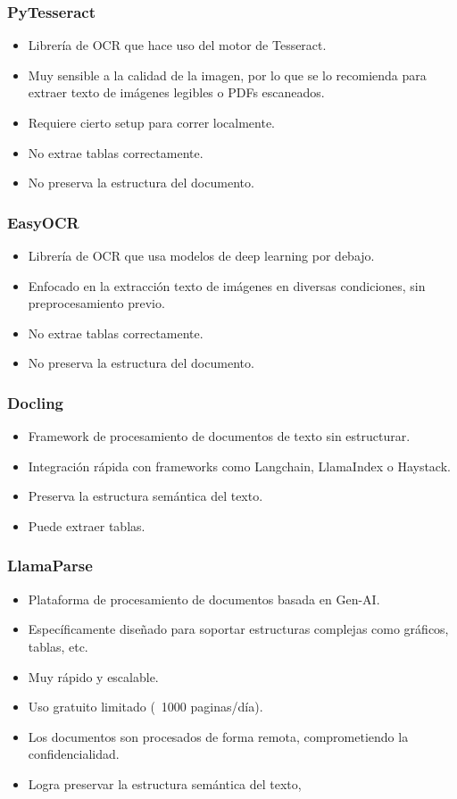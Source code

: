 \documentclass[12pt, a4paper]{report}
\begin{document}
\subsubsection*{PyTesseract}
\begin{itemize}
    \item Librería de OCR que hace uso del motor de Tesseract.
    \item Muy sensible a la calidad de la imagen, por lo que se lo recomienda para extraer texto de imágenes legibles o PDFs escaneados.
    \item Requiere cierto setup para correr localmente.
    \item No extrae tablas correctamente.
    \item No preserva la estructura del documento.
\end{itemize}

\subsubsection*{EasyOCR}
\begin{itemize}
    \item Librería de OCR que usa modelos de deep learning por debajo.
    \item Enfocado en la extracción texto de imágenes en diversas condiciones, sin preprocesamiento previo.
    \item No extrae tablas correctamente.
    \item No preserva la estructura del documento.
\end{itemize}

\subsubsection*{Docling}
\begin{itemize}
    \item Framework de procesamiento de documentos de texto sin estructurar.
    \item Integración rápida con frameworks como Langchain, LlamaIndex o Haystack.
    \item Preserva la estructura semántica del texto.
    \item Puede extraer tablas.
\end{itemize}

\subsubsection*{LlamaParse}
\begin{itemize}
    \item Plataforma de procesamiento de documentos basada en Gen-AI.
    \item Específicamente diseñado para soportar estructuras complejas como gráficos, tablas, etc.
    \item Muy rápido y escalable.
    \item Uso gratuito limitado (~1000 paginas/día).
    \item Los documentos son procesados de forma remota, comprometiendo la confidencialidad.
    \item Logra preservar la estructura semántica del texto,
\end{itemize}
\end{document}
